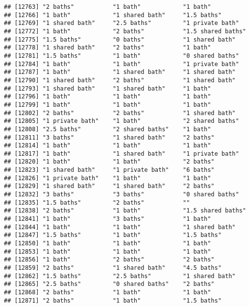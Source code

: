 \documentclass[
]{article}
\begin{document}
\begin{verbatim}
## [12763] "2 baths"           "1 bath"            "1 bath"           
## [12766] "1 bath"            "1 shared bath"     "1.5 baths"        
## [12769] "1 shared bath"     "2.5 baths"         "1 private bath"   
## [12772] "1 bath"            "2 baths"           "1.5 shared baths" 
## [12775] "1.5 baths"         "0 baths"           "1 shared bath"    
## [12778] "1 shared bath"     "2 baths"           "1 bath"           
## [12781] "1.5 baths"         "1 bath"            "0 shared baths"   
## [12784] "1 bath"            "1 bath"            "1 private bath"   
## [12787] "1 bath"            "1 shared bath"     "1 shared bath"    
## [12790] "1 shared bath"     "2 baths"           "1 shared bath"    
## [12793] "1 shared bath"     "1 shared bath"     "1 bath"           
## [12796] "1 bath"            "1 bath"            "1 bath"           
## [12799] "1 bath"            "1 bath"            "1 bath"           
## [12802] "2 baths"           "2 baths"           "1 shared bath"    
## [12805] "1 private bath"    "1 bath"            "2 shared baths"   
## [12808] "2.5 baths"         "2 shared baths"    "1 bath"           
## [12811] "3 baths"           "1 shared bath"     "2 baths"          
## [12814] "1 bath"            "1 bath"            "1 bath"           
## [12817] "1 bath"            "1 shared bath"     "1 private bath"   
## [12820] "1 bath"            "1 bath"            "2 baths"          
## [12823] "1 shared bath"     "1 private bath"    "6 baths"          
## [12826] "1 private bath"    "1 bath"            "1 bath"           
## [12829] "1 shared bath"     "1 shared bath"     "2 baths"          
## [12832] "3 baths"           "3 baths"           "0 shared baths"   
## [12835] "1.5 baths"         "2 baths"           ""                 
## [12838] "2 baths"           "1 bath"            "1.5 shared baths" 
## [12841] "1 bath"            "3 baths"           "1 bath"           
## [12844] "1 bath"            "1 bath"            "1 shared bath"    
## [12847] "1.5 baths"         "1 bath"            "1.5 baths"        
## [12850] "1 bath"            "1 bath"            "1 bath"           
## [12853] "1 bath"            "1 bath"            "1 bath"           
## [12856] "1 bath"            "2 baths"           "2 baths"          
## [12859] "2 baths"           "1 shared bath"     "4.5 baths"        
## [12862] "1.5 baths"         "2.5 baths"         "1 shared bath"    
## [12865] "2.5 baths"         "0 shared baths"    "2 baths"          
## [12868] "2 baths"           "1 bath"            "1 bath"           
## [12871] "2 baths"           "1 bath"            "1.5 baths"        

\end{verbatim}
\end{document}
